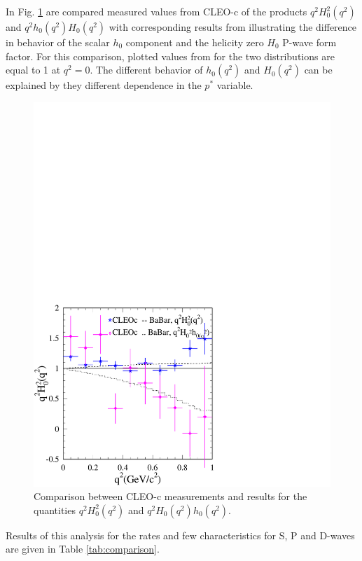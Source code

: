 In Fig. \ref{fig:h0FF} are compared measured values from CLEO-c
of the products $q^2H_0^2(q^2)$ and $q^2h_0(q^2)H_0(q^2)$ with 
corresponding results from \babar illustrating the difference in behavior
of the scalar $h_0$ component and the helicity zero $H_0$ P-wave form factor.
For this comparison, plotted values from \babar for the two distributions
are equal to 1 at $q^2=0$. The different behavior of $h_0(q^2)$
and $H_0(q^2)$ can be explained by they different dependence in the 
$p^*$ variable.
\begin{figure}[htbp!]
  \begin{center}
\includegraphics[bb=0 0 425 425,width=.60\textwidth]{figures/charm/sl_ff_compar_cleoc.pdf}
  \end{center}
  \caption[]{{Comparison between CLEO-c measurements and \babar results
for the quantities $q^2H_0^2(q^2)$ and
 $q^2H_0(q^2)h_0(q^2)$.}
   \label{fig:h0FF}}
\end{figure}
Results of this analysis for the rates and few characteristics 
for S, P and D-waves are given in Table \ref{tab:comparison}.

